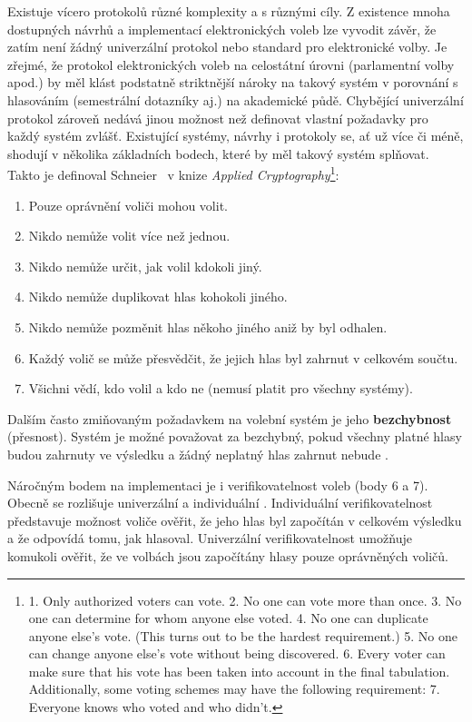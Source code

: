 \label{section:pozadavky}
Existuje vícero protokolů různé komplexity a s různými cíly. Z existence mnoha dostupných návrhů a implementací elektronických voleb lze vyvodit závěr, že zatím není žádný univerzální protokol nebo standard pro elektronické volby.  Je zřejmé, že protokol elektronických voleb na celostátní úrovni (parlamentní volby apod.) by měl klást podstatně striktnější nároky na takový systém v porovnání s hlasováním (semestrální dotazníky aj.)  na akademické půdě. Chybějící univerzální protokol zároveň nedává jinou možnost než definovat vlastní požadavky pro každý systém zvlášť.
\clearpage
Existující systémy, návrhy i protokoly se, ať už více či méně, shodují v několika základních bodech, které by měl takový systém splňovat. Takto je definoval Schneier~\cite{Schneier1996} v knize \textit{Applied Cryptography}\footnote{
1. Only authorized voters can vote.
2. No one can vote more than once.
3. No one can determine for whom anyone else voted.
4. No one can duplicate anyone else’s vote. (This turns out to be the
hardest requirement.)
5. No one can change anyone else’s vote without being discovered.
6. Every voter can make sure that his vote has been taken into account
in the final tabulation.
Additionally, some voting schemes may have the following requirement:
7. Everyone knows who voted and who didn’t.\cite{Schneier1996}
}:
\begin{enumerate}
	\item Pouze oprávnění voliči mohou volit.
	\item Nikdo nemůže volit více než jednou.
	\item Nikdo nemůže určit, jak volil kdokoli jiný.
	\item Nikdo nemůže duplikovat hlas kohokoli jiného.
	\item Nikdo nemůže pozměnit hlas někoho jiného aniž by byl odhalen.
	\item Každý volič se může přesvědčit, že jejich hlas byl zahrnut v celkovém součtu.
	\item Všichni vědí, kdo volil a kdo ne (nemusí platit pro všechny systémy).
\end{enumerate}


Dalším často zmiňovaným požadavkem na volební systém je jeho \textbf{bezchybnost} (přesnost). Systém je možné považovat za bezchybný, pokud všechny platné hlasy budou zahrnuty ve výsledku a žádný neplatný hlas zahrnut nebude \cite{4285237}\cite{QADAH2007376}\cite{10.1007/978-3-642-03315-5_13}.

Náročným bodem na implementaci je i verifikovatelnost voleb (body 6 a 7). Obecně se rozlišuje univerzální a individuální \cite{4285237}\cite{10.1007/978-3-642-03315-5_13}. Individuální verifikovatelnost představuje možnost voliče ověřit, že jeho hlas byl započítán v celkovém výsledku a že odpovídá tomu, jak hlasoval. Univerzální verifikovatelnost umožňuje komukoli ověřit, že ve volbách jsou započítány hlasy pouze oprávněných voličů.

